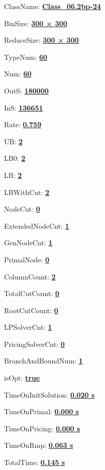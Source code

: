 \documentclass[11pt]{article}
\begin{document}
\pagestyle{empty}


ClassName: \underline{\textbf{Class_06.2bp-24}}
\par
BinSize: \underline{\textbf{300 × 300}}
\par
ReduceSize: \underline{\textbf{300 × 300}}
\par
TypeNum: \underline{\textbf{60}}
\par
Num: \underline{\textbf{60}}
\par
OutS: \underline{\textbf{180000}}
\par
InS: \underline{\textbf{136651}}
\par
Rate: \underline{\textbf{0.759}}
\par
UB: \underline{\textbf{2}}
\par
LB0: \underline{\textbf{2}}
\par
LB: \underline{\textbf{2}}
\par
LBWithCut: \underline{\textbf{2}}
\par
NodeCut: \underline{\textbf{0}}
\par
ExtendedNodeCnt: \underline{\textbf{1}}
\par
GenNodeCnt: \underline{\textbf{1}}
\par
PrimalNode: \underline{\textbf{0}}
\par
ColumnCount: \underline{\textbf{2}}
\par
TotalCutCount: \underline{\textbf{0}}
\par
RootCutCount: \underline{\textbf{0}}
\par
LPSolverCnt: \underline{\textbf{1}}
\par
PricingSolverCnt: \underline{\textbf{0}}
\par
BranchAndBoundNum: \underline{\textbf{1}}
\par
isOpt: \underline{\textbf{true}}
\par
TimeOnInitSolution: \underline{\textbf{0.020 s}}
\par
TimeOnPrimal: \underline{\textbf{0.000 s}}
\par
TimeOnPricing: \underline{\textbf{0.000 s}}
\par
TimeOnRmp: \underline{\textbf{0.063 s}}
\par
TotalTime: \underline{\textbf{0.145 s}}
\par
\newpage
\end{document}
